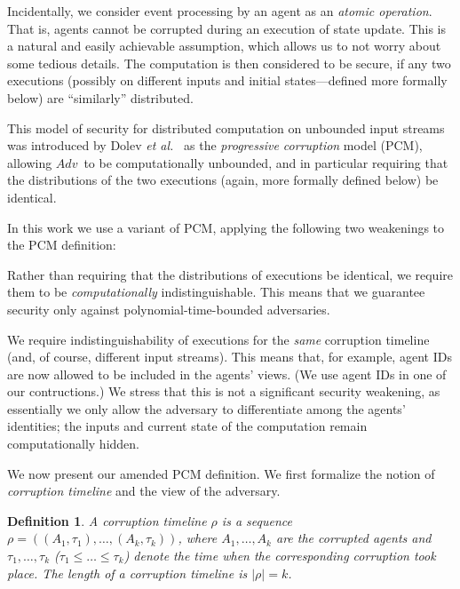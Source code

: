 \documentclass[letterpaper,11pt]{article}
\newcommand{\Ad}{$Adv$}
\newtheorem{definition}{Definition}
\newlength{\saveparindent}
\newlength{\saveparskip}
\newcounter{ctr}
\newenvironment{newenum}{\begin{list}{{\rm \arabic{ctr}.}\hfill}{\usecounter{ctr}\labelwidth=17pt\labelsep=6pt \leftmargin=23pt \topsep=.5pt\setlength{\listparindent}{\saveparindent}\setlength{\parsep}{\saveparskip}\setlength{\itemsep}{5pt} }}{\end{list}}
\begin{document}
Incidentally, we consider event processing by an agent as an
{\em atomic operation}.  That is, agents cannot be corrupted during an
execution of
state update.  This
is a natural and easily achievable assumption, which allows us to not
worry about some tedious details.  The computation is then considered
to be secure, if any two executions (possibly on different inputs and
initial states---defined more formally
below) 
are ``similarly''
distributed.  

This model of security for distributed computation on unbounded input
streams was introduced by Dolev {\em et al.}~\cite{DGGK11} as the {\it
progressive corruption} model (PCM), allowing \Ad\ to be
computationally unbounded, and in particular requiring that the
distributions of the two executions (again, more formally defined
below) be identical.

In this work we use a variant of PCM, applying the following two
weakenings to the PCM definition:
\begin{newenum}
\item Rather than requiring that the distributions of executions be identical,
we require them to be {\em computationally} indistinguishable.
This means that we guarantee security only against polynomial-time-bounded
adversaries.


\item We 
require indistinguishability of executions for the {\em same} corruption
timeline (and, of course, different input streams).  This means that,
for example, agent IDs are now allowed to be included in the agents'
views. (We use agent IDs in one of our contructions.)
We stress that this is not a significant security weakening,
as essentially we only allow the adversary to differentiate among the
agents' identities;
the inputs and current state of the computation remain computationally
hidden.
\end{newenum}


We now present our amended PCM definition.  We first formalize the
notion of 
{\em corruption timeline} and  the view of the adversary.



\begin{definition}
A {\em corruption timeline} $\rho$ is a sequence $\rho=((A_1,
\tau_1),\ldots,(A_k, \tau_k))$, where $A_1,\ldots,A_k$ are the
corrupted agents and $\tau_1,\ldots,\tau_k$ ($\tau_1 \leq \ldots \leq \tau_k$)
 denote the time when the corresponding corruption took place.
The {\em length} of
a corruption timeline is $|\rho|=k$.
\end{definition} 
\end{document}
